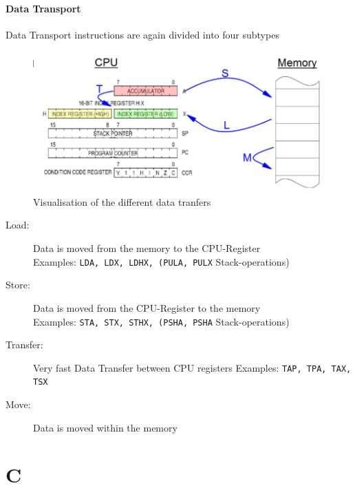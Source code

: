 \documentclass[a4paper, 11pt, nofootinbib]{book}
\newcommand{\code}[1]{\texttt{#1}}
\begin{document}
\subsubsection{Data Transport}
Data Transport instructions are again divided into four subtypes

\begin{figure}[htb!]
	\centering
	\includegraphics[keepaspectratio=true,height=15\baselineskip]{assOperations.PNG}
	\caption{Visualisation of the different data tranfers}
	\label{label}
\end{figure}

\begin{description}
	\item[Load: ] Data is moved from the memory to the CPU-Register \\
		Examples: \code{LDA, LDX, LDHX, (PULA, PULX} Stack-operations)
	\item[Store: ] Data is moved from the CPU-Register to the memory \\
		Examples: \code{STA, STX, STHX, (PSHA, PSHA} Stack-operations) 
	\item[Transfer: ] Very fast Data Transfer between CPU registers
		Examples: \code{TAP, TPA, TAX, TSX}
	\item[Move: ] Data is moved within the memory
\end{description}



\chapter{C}
\end{document}
